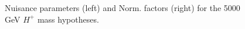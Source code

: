 \begin{figure}[H]
  \centering
  \caption{Nuisance parameters (left) and Norm. factors (right) for the 5000 GeV $H^{+}$ mass hypotheses.}
  \label{fig:Prefit_Hp5000_Blind}
\end{figure}


